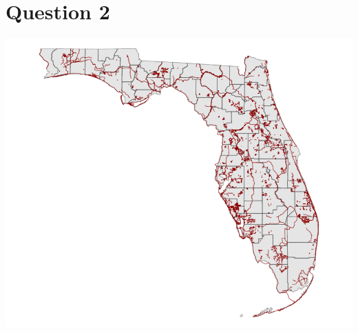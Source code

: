 \documentclass{article}
\begin{document}
\section*{Question 2}
\begin{center}
\includegraphics{hw1_joe_brew_R-003}
\end{center}

\newpage
\end{document}
